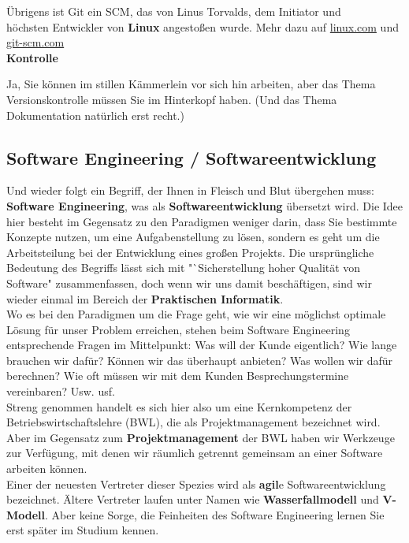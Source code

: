 Übrigens ist Git ein SCM, das von Linus Torvalds, dem Initiator und\\
höchsten Entwickler von \textbf{Linux} angestoßen wurde. Mehr dazu auf \url{linux.com} und \url{git-scm.com}\\

\textbf{Kontrolle}

Ja, Sie können im stillen Kämmerlein vor sich hin arbeiten, aber das Thema Versionskontrolle müssen Sie im Hinterkopf haben. (Und das Thema Dokumentation natürlich erst recht.)

\subsection{Software Engineering / Softwareentwicklung}

Und wieder folgt ein Begriff, der Ihnen in Fleisch und Blut übergehen muss: \textbf{Software Engineering}, was als \textbf{Softwareentwicklung} übersetzt wird. Die Idee hier besteht im Gegensatz zu den Paradigmen weniger darin, dass Sie bestimmte Konzepte nutzen, um eine Aufgabenstellung zu lösen, sondern es geht um die Arbeitsteilung bei der Entwicklung eines großen Projekts. Die ursprüngliche Bedeutung des Begriffs lässt sich mit "`Sicherstellung hoher Qualität von Software" zusammenfassen, doch wenn wir uns damit beschäftigen, sind wir wieder einmal im Bereich der \textbf{Praktischen Informatik}.\\

Wo es bei den Paradigmen um die Frage geht, wie wir eine möglichst optimale Lösung für unser Problem erreichen, stehen beim Software Engineering entsprechende Fragen im Mittelpunkt: Was will der Kunde eigentlich? Wie lange brauchen wir dafür? Können wir das überhaupt anbieten? Was wollen wir dafür berechnen? Wie oft müssen wir mit dem Kunden Besprechungstermine vereinbaren? Usw. usf.\\

Streng genommen handelt es sich hier also um eine Kernkompetenz der Betriebswirtschaftslehre (BWL), die als Projektmanagement bezeichnet wird. Aber im Gegensatz zum \textbf{Projektmanagement} der BWL haben wir Werkzeuge zur Verfügung, mit denen wir räumlich getrennt gemeinsam an einer Software arbeiten können.\\

Einer der neuesten Vertreter dieser Spezies wird als \textbf{agil}e Softwareentwicklung bezeichnet. Ältere Vertreter laufen unter Namen wie \textbf{Wasserfallmodell} und \textbf{V-Modell}. Aber keine Sorge, die Feinheiten des Software Engineering lernen Sie erst später im Studium kennen.\\

